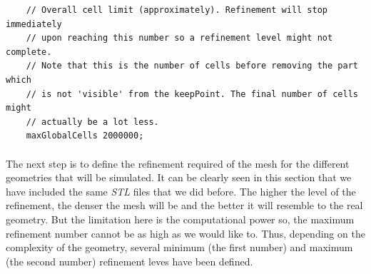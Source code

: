 \begin{footnotesize}
\begin{verbatim}
    // Overall cell limit (approximately). Refinement will stop immediately
    // upon reaching this number so a refinement level might not complete.
    // Note that this is the number of cells before removing the part which
    // is not 'visible' from the keepPoint. The final number of cells might
    // actually be a lot less.
    maxGlobalCells 2000000;
\end{verbatim}
\end{footnotesize}

\paragraph{}The next step is to define the refinement required of the mesh for the different geometries that will be simulated. It can be clearly seen in this section that we have included the same \textit{STL} files that we did before. The higher the level of the refinement, the denser the mesh will be and the better it will resemble to the real geometry. But the limitation here is the computational power so, the maximum refinement number cannot be as high as we would like to. Thus, depending on the complexity of the geometry, several minimum (the first number) and maximum (the second number) refinement leves have been defined.

